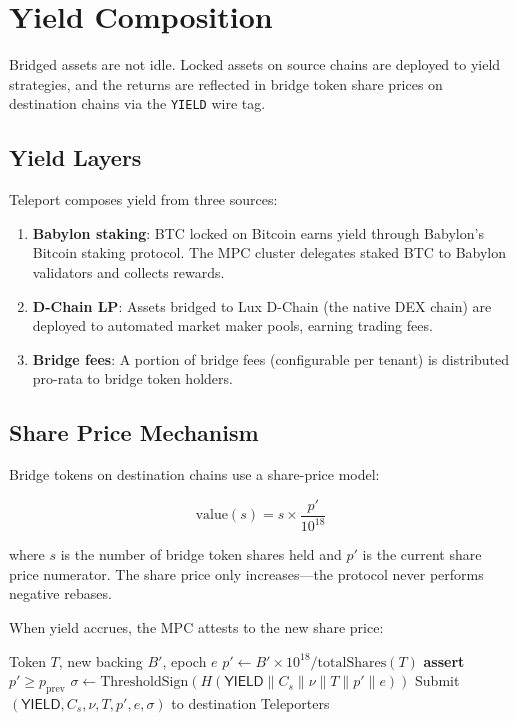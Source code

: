 \section{Yield Composition}

\label{sec:yield}

Bridged assets are not idle. Locked assets on source chains are deployed to yield strategies, and the returns are reflected in bridge token share prices on destination chains via the \texttt{YIELD} wire tag.

\subsection{Yield Layers}

Teleport composes yield from three sources:

\begin{enumerate}[nosep]
  \item \textbf{Babylon staking}: BTC locked on Bitcoin earns yield through Babylon's Bitcoin staking protocol. The MPC cluster delegates staked BTC to Babylon validators and collects rewards.
  \item \textbf{D-Chain LP}: Assets bridged to Lux D-Chain (the native DEX chain) are deployed to automated market maker pools, earning trading fees.
  \item \textbf{Bridge fees}: A portion of bridge fees (configurable per tenant) is distributed pro-rata to bridge token holders.
\end{enumerate}

\subsection{Share Price Mechanism}

Bridge tokens on destination chains use a share-price model:

\begin{equation}
  \mathrm{value}(s) = s \times \frac{p'}{10^{18}}
\end{equation}

where $s$ is the number of bridge token shares held and $p'$ is the current share price numerator. The share price only increases---the protocol never performs negative rebases.

When yield accrues, the MPC attests to the new share price:

\begin{algorithm}[H]
\caption{Yield Attestation}
\begin{algorithmic}[1]
\Require Token $T$, new backing $B'$, epoch $e$
\State $p' \leftarrow B' \times 10^{18} / \mathrm{totalShares}(T)$
\State \textbf{assert} $p' \geq p_{\mathrm{prev}}$ 
\State $\sigma \leftarrow \mathrm{ThresholdSign}(H(\mathsf{YIELD} \| C_s \| \nu \| T \| p' \| e))$
\State Submit $(\mathsf{YIELD}, C_s, \nu, T, p', e, \sigma)$ to destination Teleporters
\end{algorithmic}
\end{algorithm}

